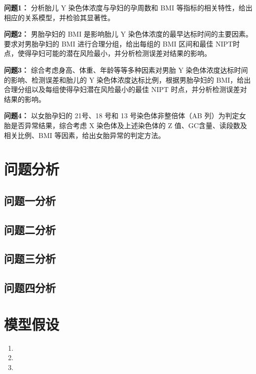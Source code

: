 \documentclass[withoutpreface,bwprint]{cumcmthesis} %
\begin{document}
\textbf{问题1：}
分析胎儿 Y 染色体浓度与孕妇的孕周数和 BMI 等指标的相关特性，给出相应的关系模型，并检验其显著性。

\textbf{问题2：}
男胎孕妇的 BMI 是影响胎儿 Y 染色体浓度的最早达标时间的主要因素。要求对男胎孕妇的 BMI 进行合理分组，给出每组的 BMI 区间和最佳 NIPT时点，使得孕妇可能的潜在风险最小，并分析检测误差对结果的影响。

\textbf{问题3：}
综合考虑身高、体重、年龄等等多种因素对男胎 Y 染色体浓度达标时间的影响、检测误差和胎儿的 Y 染色体浓度达标比例，根据男胎孕妇的 BMI，给出合理分组以及每组使得孕妇潜在风险最小的最佳 NIPT 时点，并分析检测误差对结果的影响。

\textbf{问题4：}
以女胎孕妇的 21号、18 号和 13 号染色体非整倍体（AB 列）为判定女胎是否异常结果，综合考虑 X 染色体及上述染色体的 Z 值、GC含量、读段数及相关比例、BMI 等因素，给出女胎异常的判定方法。





\section{问题分析}
\subsection{问题一分析}

\subsection{问题二分析}

\subsection{问题三分析}

\subsection{问题四分析}


\section{模型假设}

\begin{enumerate}
    \item 
    \item 
    \item 
\end{enumerate}
\end{document}
